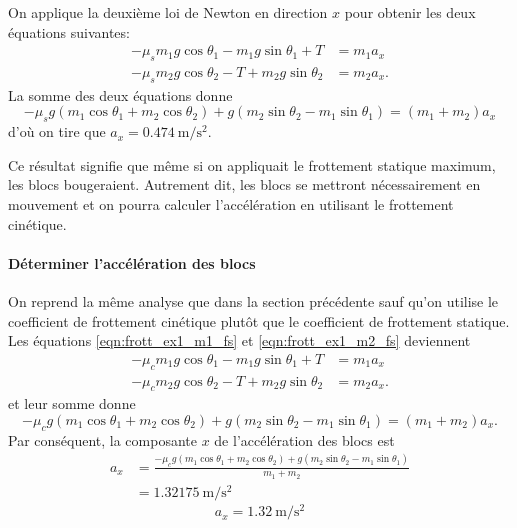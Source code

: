 \documentclass{tufte-handout}
\begin{document}
On applique la deuxième loi de Newton en direction $x$ pour obtenir les deux
équations suivantes:
\begin{align}
  -\mu_s m_1 g\cos\theta_1 - m_1g\sin\theta_1 + T &= m_1a_x \label{eqn:frott_ex1_m1_fs} \\
  -\mu_s m_2 g\cos\theta_2 - T + m_2g\sin\theta_2 &= m_2 a_x.  \label{eqn:frott_ex1_m2_fs}
\end{align}
La somme des deux équations donne
\begin{equation}
  -\mu_s g (m_1 \cos\theta_1 + m_2\cos\theta_2) + g (m_2 \sin\theta_2 -
  m_1\sin\theta_1) = (m_1 + m_2)a_x  \label{eqn:frott_ex1_acc_fs}
\end{equation}
d'où on tire que $a_x = \SI{0.474}{\meter\per\second\squared}$.

Ce résultat signifie que même si on appliquait le frottement statique maximum,
les blocs bougeraient.  Autrement dit, les blocs se mettront nécessairement en
mouvement et on pourra calculer l'accélération en utilisant le frottement
cinétique.


\paragraph{Déterminer l'accélération des blocs}

On reprend la même analyse que dans la section précédente sauf qu'on utilise le
coefficient de frottement cinétique plutôt que le coefficient de frottement
statique.  Les équations \ref{eqn:frott_ex1_m1_fs} et \ref{eqn:frott_ex1_m2_fs}
deviennent
\begin{align}
  -\mu_c m_1 g\cos\theta_1 - m_1g\sin\theta_1 + T &= m_1a_x \label{eqn:frott_ex1_m1_fc} \\
  -\mu_c m_2 g\cos\theta_2 - T + m_2g\sin\theta_2 &= m_2 a_x.  \label{eqn:frott_ex1_m2_fc}
\end{align}
et leur somme donne
\begin{equation}
  -\mu_c g (m_1 \cos\theta_1 + m_2\cos\theta_2) + g (m_2 \sin\theta_2 -
  m_1\sin\theta_1) = (m_1 + m_2)a_x.  \label{eqn:frott_ex1_acc_fc}
\end{equation}
Par conséquent, la composante $x$ de l'accélération des blocs est 
\begin{align*}
  a_x &= \frac{-\mu_c g (m_1 \cos\theta_1 + m_2\cos\theta_2) + g (m_2 \sin\theta_2 -
  m_1\sin\theta_1)}{m_1 + m_2} \\
    &= \SI{1.32175}{\meter\per\second\squared}
\end{align*}
\[
  \boxed{a_x = \SI{1.32}{\meter\per\second\squared}}
\]
\end{document}
